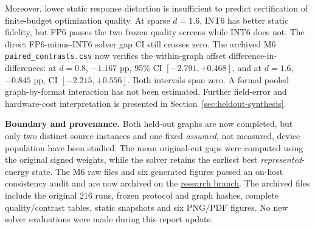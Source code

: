 Moreover, lower static response distortion is insufficient
to predict certification of finite-budget optimization quality.
At sparse $d=1.6$, INT6 has better static fidelity, but FP6
passes the two frozen quality screens while INT6 does not.
The direct FP6-minus-INT6 solver gap CI still crosses zero.
The archived M6 \texttt{paired\_contrasts.csv} now verifies the within-graph
offset difference-in-differences: at $d=0.8$,
$-1.167$ pp, 95\% CI $[-2.791,+0.468]$, and at $d=1.6$,
$-0.845$ pp, CI $[-2.215,+0.556]$. Both intervals span
zero. A formal pooled graph-by-format interaction has not
been estimated. Further field-error and hardware-cost
interpretation is presented in Section~\ref{sec:heldout-synthesis}.

\noindent\textbf{Boundary and provenance.}
Both held-out graphs are now completed, but only two
distinct source instances and one fixed \emph{assumed},
not measured, device population have been studied.
The mean original-cut gaps were computed using the original
signed weights, while the solver retains the earliest best
\emph{represented}-energy state. The M6 raw files and six generated figures passed an on-host
consistency audit and are now archived on the
\href{https://github.com/Makise-okabe/MRAM_P-bit/tree/research/m4-gain-fusion-20261107/results/m2_heldout_sparse_fp6_int6_20261110}
{research branch}. The archived files include the original 216
runs, frozen protocol and graph hashes, complete quality/contrast
tables, static snapshots and six PNG/PDF figures.
No new solver evaluations were made during this report update.
